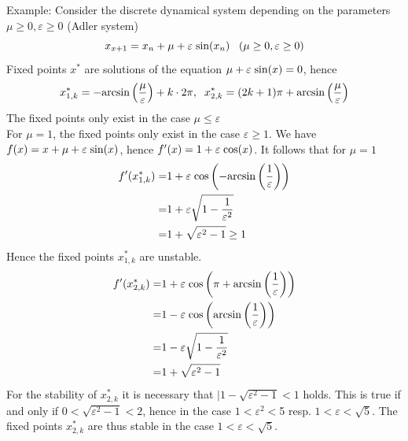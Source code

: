 Example: Consider the discrete dynamical system depending on the parameters $\mu \geq 0, \varepsilon \geq 0$ (Adler system)
\begin{equation}
  x_{x+1} = x_n + \mu + \varepsilon \; \textup{sin}(x_n) \;\;\; (\mu \geq 0, \varepsilon \geq 0)
\end{equation}
Fixed points $x^*$ are solutions of the equation $\mu + \varepsilon \; \textup{sin}(x) = 0$, hence
\begin{equation}
  x^*_{1, k} = -\textup{arcsin}\left(\frac{\mu}{\varepsilon}\right) + k \cdot 2\pi, \;\;
  x^*_{2, k} = (2k + 1)\pi + \textup{arcsin}\left(\frac{\mu}{\varepsilon}\right)
\end{equation}
The fixed points only exist in the case $\mu \leq \varepsilon$\\
For $\mu = 1$, the fixed points only exist in the case $\varepsilon \geq 1$. We have $f(x) = x + \mu + \varepsilon \; \textup{sin}(x)$, hence $f'(x) = 1 + \varepsilon \; \textup{cos}(x)$. It follows that for $\mu = 1$
\begin{equation}
  \begin{split}
    f'(x^*_{1, k}) =& 1 + \varepsilon \; \textup{cos}\left(-\textup{arcsin}\left(\frac{1}{\varepsilon}\right)\right)\\
    =& 1 + \varepsilon \sqrt{1 - \frac{1}{\varepsilon^2}}\\
    =& 1 + \sqrt{\varepsilon^2 - 1} \geq 1
  \end{split}
\end{equation}
Hence the fixed points $x^*_{1, k}$ are unstable.
\begin{equation}
  \begin{split}
    f'(x^*_{2, k}) =& 1 + \varepsilon \; \textup{cos}\left(\pi + \textup{arcsin}\left(\frac{1}{\varepsilon}\right)\right)\\
    =& 1 - \varepsilon \; \textup{cos}\left(\textup{arcsin}\left(\frac{1}{\varepsilon}\right)\right)\\
    =& 1 - \varepsilon \sqrt{1 - \frac{1}{\varepsilon^2}}\\
    =& 1 + \sqrt{\varepsilon^2 - 1}
  \end{split}
\end{equation}
For the stability of $x^*_{2, k}$ it is necessary that $|1 - \sqrt{\varepsilon^2-1} < 1$ holds. This is true if and only if $0 < \sqrt{\varepsilon^2 - 1} < 2$, hence in the case $1 < \varepsilon^2 < $5 resp. $1 < \varepsilon < \sqrt{5}$. The fixed points $x^*_{2, k}$ are thus stable in the case $1<\varepsilon<\sqrt{5}$.

